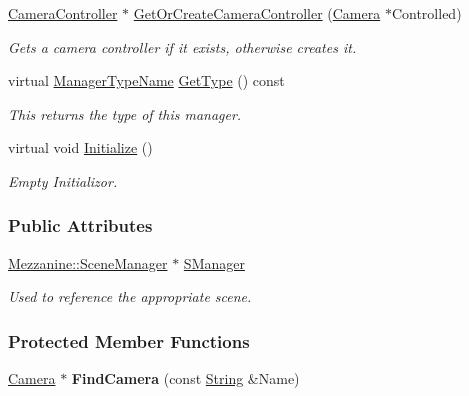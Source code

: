 \begin{DoxyCompactItemize}
\hyperlink{classMezzanine_1_1CameraController}{CameraController} $\ast$ \hyperlink{classMezzanine_1_1CameraManager_a2749012cb337dd5aa1f784c951fc9e56}{GetOrCreateCameraController} (\hyperlink{classMezzanine_1_1Camera}{Camera} $\ast$Controlled)
\begin{DoxyCompactList}\small\item\em Gets a camera controller if it exists, otherwise creates it. \item\end{DoxyCompactList}\item 
virtual \hyperlink{classMezzanine_1_1ManagerBase_a08cecf5169cad3e82be81a3a159b0b6e}{ManagerTypeName} \hyperlink{classMezzanine_1_1CameraManager_a1eb75dabfd7df1c901432d841a92fcbc}{GetType} () const 
\begin{DoxyCompactList}\small\item\em This returns the type of this manager. \item\end{DoxyCompactList}\item 
virtual void \hyperlink{classMezzanine_1_1CameraManager_a4b7f0d25f77306bca4b5c885e35363cc}{Initialize} ()
\begin{DoxyCompactList}\small\item\em Empty Initializor. \item\end{DoxyCompactList}\end{DoxyCompactItemize}
\subsubsection*{Public Attributes}
\begin{DoxyCompactItemize}
\item 
\hypertarget{classMezzanine_1_1CameraManager_a384babc63ab516b26e0e5d45ea525ced}{
\hyperlink{classMezzanine_1_1SceneManager}{Mezzanine::SceneManager} $\ast$ \hyperlink{classMezzanine_1_1CameraManager_a384babc63ab516b26e0e5d45ea525ced}{SManager}}
\label{classMezzanine_1_1CameraManager_a384babc63ab516b26e0e5d45ea525ced}

\begin{DoxyCompactList}\small\item\em Used to reference the appropriate scene. \item\end{DoxyCompactList}\end{DoxyCompactItemize}
\subsubsection*{Protected Member Functions}
\begin{DoxyCompactItemize}
\item 
\hypertarget{classMezzanine_1_1CameraManager_ae96502bb30b93a57de58a2bbd8e7903a}{
\hyperlink{classMezzanine_1_1Camera}{Camera} $\ast$ {\bfseries FindCamera} (const \hyperlink{namespaceMezzanine_acf9fcc130e6ebf08e3d8491aebcf1c86}{String} \&Name)}
\label{classMezzanine_1_1CameraManager_ae96502bb30b93a57de58a2bbd8e7903a}

\end{DoxyCompactItemize}
